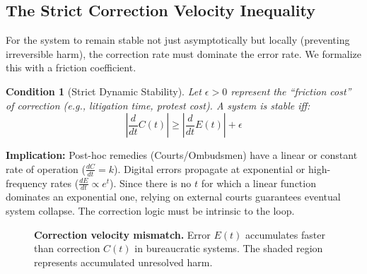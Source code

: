 \documentclass{article}
\newtheorem{condition}{Condition}
\begin{document}
\subsection{The Strict Correction Velocity Inequality}

For the system to remain stable not just asymptotically but locally (preventing irreversible harm), the correction rate must dominate the error rate. We formalize this with a friction coefficient.

\begin{condition}[Strict Dynamic Stability]
Let $\epsilon > 0$ represent the ``friction cost'' of correction (e.g., litigation time, protest cost). A system is stable iff:
\begin{equation}
\left| \frac{d}{dt} C(t) \right| \ge \left| \frac{d}{dt} E(t) \right| + \epsilon
\end{equation}
\end{condition}

\textbf{Implication:} Post-hoc remedies (Courts/Ombudsmen) have a linear or constant rate of operation ($\frac{dC}{dt} = k$). Digital errors propagate at exponential or high-frequency rates ($\frac{dE}{dt} \propto e^{t}$). Since there is no $t$ for which a linear function dominates an exponential one, relying on external courts guarantees eventual system collapse. The correction logic must be intrinsic to the loop.

\begin{figure}[htbp]
\centering
{}
\caption{\textbf{Correction velocity mismatch.} Error $E(t)$ accumulates faster than correction $C(t)$ in bureaucratic systems. The shaded region represents accumulated unresolved harm.}
\label{fig:velocity-mismatch}
\end{figure}
\end{document}
